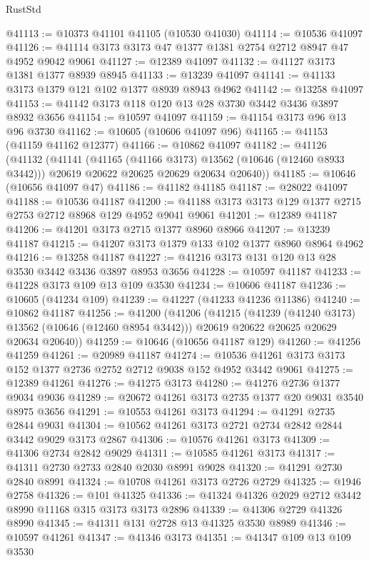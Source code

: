 \begin{lexlean}{RustStd}
\begin{coremodule}
@41113 := @10373 @41101 @41105 (@10530 @41030)
@41114 := @10536 @41097
@41126 := @41114 @3173 @3173 @47 @1377 @1381 @2754 @2712 @8947 @47 @4952 @9042 @9061
@41127 := @12389 @41097
@41132 := @41127 @3173 @1381 @1377 @8939 @8945
@41133 := @13239 @41097
@41141 := @41133 @3173 @1379 @121 @102 @1377 @8939 @8943 @4962
@41142 := @13258 @41097
@41153 := @41142 @3173 @118 @120 @13 @28 @3730 @3442 @3436 @3897 @8932 @3656
@41154 := @10597 @41097
@41159 := @41154 @3173 @96 @13 @96 @3730
@41162 := @10605 (@10606 @41097 @96)
@41165 := @41153 (@41159 @41162 @12377)
@41166 := @10862 @41097
@41182 := @41126
    (@41132
      (@41141
        (@41165 (@41166 @3173) @13562 (@10646 (@12460 @8933 @3442)))
        @20619
        @20622
        @20625
        @20629
        @20634
        @20640))
@41185 := @10646 (@10656 @41097 @47)
@41186 := @41182 @41185
@41187 := @28022 @41097
@41188 := @10536 @41187
@41200 := @41188 @3173 @3173 @129 @1377 @2715 @2753 @2712 @8968 @129 @4952 @9041 @9061
@41201 := @12389 @41187
@41206 := @41201 @3173 @2715 @1377 @8960 @8966
@41207 := @13239 @41187
@41215 := @41207 @3173 @1379 @133 @102 @1377 @8960 @8964 @4962
@41216 := @13258 @41187
@41227 := @41216 @3173 @131 @120 @13 @28 @3530 @3442 @3436 @3897 @8953 @3656
@41228 := @10597 @41187
@41233 := @41228 @3173 @109 @13 @109 @3530
@41234 := @10606 @41187
@41236 := @10605 (@41234 @109)
@41239 := @41227 (@41233 @41236 @11386)
@41240 := @10862 @41187
@41256 := @41200
    (@41206
      (@41215
        (@41239 (@41240 @3173) @13562 (@10646 (@12460 @8954 @3442)))
        @20619
        @20622
        @20625
        @20629
        @20634
        @20640))
@41259 := @10646 (@10656 @41187 @129)
@41260 := @41256 @41259
@41261 := @20989 @41187
@41274 := @10536 @41261 @3173 @3173 @152 @1377 @2736 @2752 @2712 @9038 @152 @4952 @3442 @9061
@41275 := @12389 @41261
@41276 := @41275 @3173
@41280 := @41276 @2736 @1377 @9034 @9036
@41289 := @20672 @41261 @3173 @2735 @1377 @20 @9031 @3540 @8975 @3656
@41291 := @10553 @41261 @3173
@41294 := @41291 @2735 @2844 @9031
@41304 := @10562 @41261 @3173 @2721 @2734 @2842 @2844 @3442 @9029 @3173 @2867
@41306 := @10576 @41261 @3173
@41309 := @41306 @2734 @2842 @9029
@41311 := @10585 @41261 @3173
@41317 := @41311 @2730 @2733 @2840 @2030 @8991 @9028
@41320 := @41291 @2730 @2840 @8991
@41324 := @10708 @41261 @3173 @2726 @2729
@41325 := @1946 @2758
@41326 := @101 @41325
@41336 := @41324 @41326 @2029 @2712 @3442 @8990 @11168 @315 @3173 @3173 @2896
@41339 := @41306 @2729 @41326 @8990
@41345 := @41311 @131 @2728 @13 @41325 @3530 @8989
@41346 := @10597 @41261
@41347 := @41346 @3173
@41351 := @41347 @109 @13 @109 @3530

\end{coremodule}
\end{lexlean}
